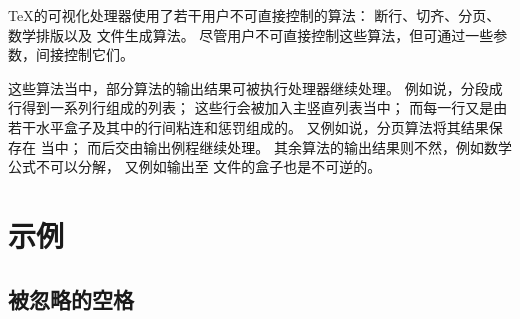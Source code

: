 \documentclass{book}
\begin{document}
\TeX 的可视化处理器使用了若干用户不可直接控制的算法：
断行、切齐、分页、数学排版以及  文件生成算法。
尽管用户不可直接控制这些算法，但可通过一些参数，间接控制它们。

这些算法当中，部分算法的输出结果可被执行处理器继续处理。
例如说，分段成行得到一系列行组成的列表；
这些行会被加入主竖直列表当中；
而每一行又是由若干水平盒子及其中的行间粘连和惩罚组成的。
又例如说，分页算法将其结果保存在  当中；
而后交由输出例程继续处理。
其余算法的输出结果则不然，例如数学公式不可以分解，
又例如输出至  文件的盒子也是不可逆的。

\section{示例}

\subsection{被忽略的空格}
\end{document}
